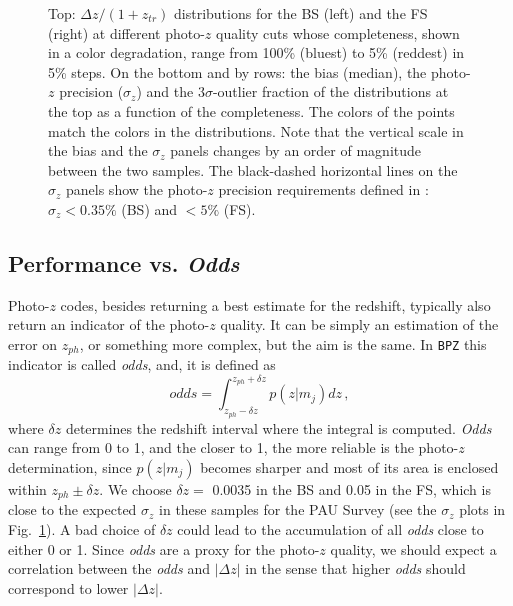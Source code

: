 \begin{figure}
\caption{Top: $\Delta z/(1+z_{tr})$ distributions for the BS (left) and the FS (right) at different photo-$z$ quality cuts whose completeness, shown in a color degradation, range from 100\% (bluest) to 5\% (reddest) in 5\% steps. On the bottom and by rows: the bias (median), the photo-$z$ precision ($\sigma_z$) and the $3\sigma$-outlier fraction of the distributions at the top as a function of the completeness. The colors of the points match the colors in the distributions. Note that the vertical scale in the bias and the $\sigma_z$ panels changes by an order of magnitude between the two samples. The black-dashed horizontal lines on the $\sigma_z$ panels show the photo-$z$ precision requirements defined in \citet{Gaztanaga2012}: $\sigma_z<0.35\%$ (BS) and $<5\%$ (FS).}
\label{pz_results}
\end{figure}

\subsection{Performance vs. \textit{Odds}}
Photo-$z$ codes, besides returning a best estimate for the redshift, typically also return an indicator of the photo-$z$ quality. It can be simply an estimation of the error on $z_{ph}$, or something more complex, but the aim is the same. In \texttt{BPZ} this indicator is called \textit{odds}, and, it is defined as
\begin{equation}
odds = \int^{z_{ph}+\delta z}_{z_{ph}-\delta z}p(z|m_j)dz \, ,
\label{odds}
\end{equation}
where $\delta z$ determines the redshift interval where the integral is computed. \textit{Odds} can range from 0 to 1, and the closer to 1, the more reliable is the photo-$z$ determination, since $p(z|m_j)$ becomes sharper and most of its area is enclosed within $z_{ph}\pm \delta z$. We choose $\delta z=$ 0.0035 in the BS and 0.05 in the FS, which is close to the expected $\sigma_z$ in these samples for the PAU Survey (see the $\sigma_z$ plots in Fig.~\ref{pz_results}). A bad choice of $\delta z$ could lead to the accumulation of all \textit{odds} close to either 0 or 1. Since \textit{odds} are a proxy for the photo-$z$ quality, we should expect a correlation between the \textit{odds} and $|\Delta z|$ in the sense that higher \textit{odds} should correspond to lower $|\Delta z|$. 

